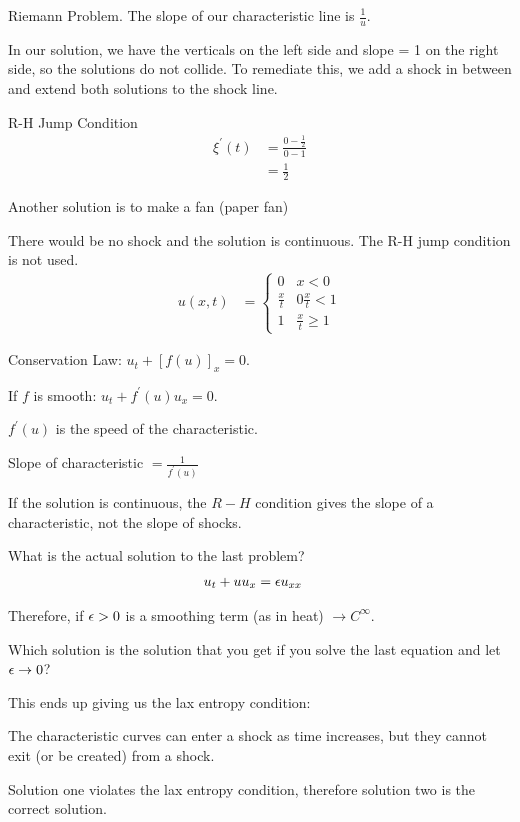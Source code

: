   Riemann Problem. The slope of our characteristic line is $\frac{1}{u}$.

  In our solution, we have the verticals on the left side and slope = 1 on the right side, so the solutions do not collide. To remediate this, we add a shock in between and extend both solutions to the shock line.

  R-H Jump Condition
  \begin{align}
    \xi^\prime(t) & = \frac{0 - \frac{1}{2}}{0 - 1}\\
    & = \frac{1}{2}
  \end{align}

  Another solution is to make a fan (paper fan)

  There would be no shock and the solution is continuous. The R-H jump condition is not used.
  \begin{align}
    u(x, t) & =
    \begin{cases}
      0 & x < 0\\
      \frac{x}{t} & 0 \frac{x}{t} < 1\\
      1 & \frac{x}{t} \geq 1
    \end{cases}
  \end{align}

  Conservation Law: $u_t + [f(u)]_x = 0$.

  If $f$ is smooth: $u_t + f^\prime(u) u_x = 0$.

  $f^\prime(u)$ is the speed of the characteristic.

  Slope of characteristic $= \frac{1}{f^\prime(u)}$

  \note If the solution is continuous, the $R-H$ condition gives the slope of a characteristic, not the slope of shocks.

  What is the actual solution to the last problem?
  \begin{align}
    u_t + u u_x & = \epsilon u_{xx}
  \end{align}

  Therefore, if $\epsilon > 0$ is a smoothing term (as in heat) $\to C^\infty$.

  Which solution is the solution that you get if you solve the last equation and let $\epsilon \to 0$?

  This ends up giving us the lax entropy condition:

  The characteristic curves can enter a shock as time increases, but they cannot exit (or be created) from a shock.

  Solution one violates the lax entropy condition, therefore solution two is the correct solution.


